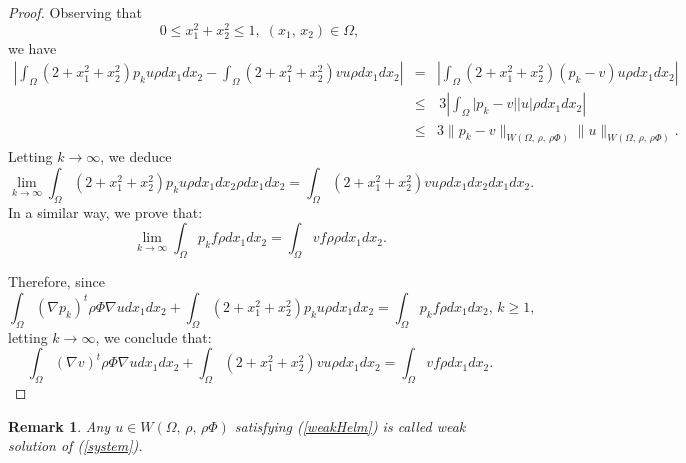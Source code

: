 \documentclass[11pt]{article}
\newtheorem{remark}[theorem]{Remark}
\begin{document}
\begin{proof}
			 Observing that 
			 \begin{equation}\label{bcc}
			 	0\leq x_1^2+x_2^2\leq 1,\; (x_1,\,x_2)\in\Omega,
			 \end{equation}
			 we have
			\begin{eqnarray*}
			\left\lvert	\int_{\Omega}\left(2+{x_1^2+x_2^2}\right)p_ku\rho   dx_1dx_2-\int_{\Omega}\left(2+{x_1^2+x_2^2}\right)vu\rho  dx_1dx_2\right\rvert&=&\left\lvert\int_{\Omega}\left(2+{x_1^2+x_2^2}\right)\left( p_k-v\right)u\rho dx_1dx_2\right\rvert\\
			&\leq&\,3 \left\lvert\int_{\Omega}\lvert p_k-v\rvert \lvert u\rvert\rho dx_1dx_2\right\rvert\\
			&\leq&3\|p_k-v\|_{W\left(\Omega,\, \rho ,\,\rho \Phi\right)}\|u\|_{W\left(\Omega,\, \rho ,\,\rho \Phi\right)}.
			\end{eqnarray*}
			Letting $k\to\infty$, we deduce
			\begin{equation*}
				\lim_{k \to \infty }\int_{\Omega}\left(2+{x_1^2+x_2^2}\right)p_ku\rho   dx_1dx_2\rho   dx_1dx_2=\int_{\Omega}\left(2+{x_1^2+x_2^2}\right)vu\rho   dx_1dx_2  dx_1dx_2.
			\end{equation*}
			In a similar way, we prove that:
			\begin{equation*}
				\lim_{k \to \infty }\int_{\Omega}p_kf\rho   dx_1dx_2=\int_{\Omega}vf\rho\rho  dx_1dx_2.
			\end{equation*}
			
			Therefore, since
			\begin{equation*}
				\int_{\Omega}(\nabla p_k)^t\rho \Phi\nabla udx_1dx_2+\int_{\Omega}\left(2+{x_1^2+x_2^2}\right)p_ku\rho dx_1dx_2=\int_{\Omega}p_kf\rho dx_1dx_2,\,k\geq 1,
			\end{equation*}
			letting $k\to\infty$, we conclude that:
			\begin{equation*}
				\int_{\Omega}(\nabla v)^t\rho \Phi\nabla udx_1dx_2+\int_{\Omega}\left(2+{x_1^2+x_2^2}\right)vu\rho dx_1dx_2=\int_{\Omega}vf\rho dx_1dx_2.
			\end{equation*}
	\end{proof}
	
	\begin{remark}
		Any $u\in W\left(\Omega,\,\rho ,\,\rho \Phi\right)$ satisfying (\ref{weakHelm}) is called weak solution of (\ref{system}).
	\end{remark}
\end{document}
